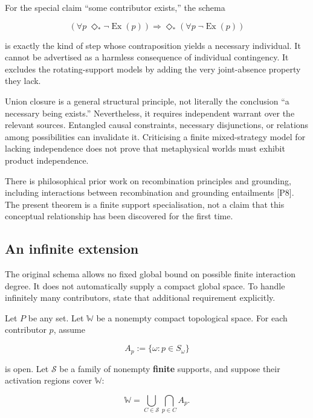 \documentclass[11pt,a4paper]{article}
\begin{document}
For the special claim ``some contributor exists,'' the schema

\nopagebreak[4]

\[
\left(\forall p\;\Diamond_*\neg\operatorname{Ex}(p)\right)
\Longrightarrow
\Diamond_*\left(\forall p\;\neg\operatorname{Ex}(p)\right)
\]

is exactly the kind of step whose contraposition yields a necessary
individual. It cannot be advertised as a harmless consequence of
individual contingency. It excludes the rotating-support models by
adding the very joint-absence property they lack.

Union closure is a general structural principle, not literally the
conclusion ``a necessary being exists.'' Nevertheless, it requires
independent warrant over the relevant sources. Entangled causal
constraints, necessary disjunctions, or relations among possibilities
can invalidate it. Criticising a finite mixed-strategy model for lacking
independence does not prove that metaphysical worlds must exhibit
product independence.

There is philosophical prior work on recombination principles and
grounding, including interactions between recombination and grounding
entailments {[}P8{]}. The present theorem is a finite support
specialisation, not a claim that this conceptual relationship has been
discovered for the first time.

\subsection{An infinite extension}\label{an-infinite-extension}

The original schema allows no fixed global bound on possible finite
interaction degree. It does not automatically supply a compact global
space. To handle infinitely many contributors, state that additional
requirement explicitly.

Let \(P\) be any set. Let \(\mathbb W\) be a nonempty compact
topological space. For each contributor \(p\), assume

\nopagebreak[4]

\[
A_p:=\{\omega:p\in S_\omega\}
\]

is open. Let \(\mathscr S\) be a family of nonempty \textbf{finite}
supports, and suppose their activation regions cover \(\mathbb W\):

\nopagebreak[4]

\[
\mathbb W=\bigcup_{C\in\mathscr S}\bigcap_{p\in C}A_p.
\]
\end{document}
